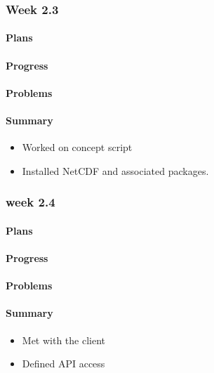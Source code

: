 \documentclass[onecolumn, draftclsnofoot,10pt, compsoc]{article}
\begin{document}
		\subsubsection{Week 2.3}
			\paragraph{Plans} \hfill \break

			\paragraph{Progress} \hfill \break

			\paragraph{Problems} \hfill \break

			\paragraph{Summary} \hfill \break
				\begin{itemize}
                    \item Worked on concept script
                    \item Installed NetCDF and associated packages.
                \end{itemize}


		\subsubsection{week 2.4}
			\paragraph{Plans} \hfill \break

			\paragraph{Progress} \hfill \break

			\paragraph{Problems} \hfill \break

			\paragraph{Summary} \hfill \break
				\begin{itemize}
                    \item Met with the client
                    \item Defined API access
                \end{itemize}
\end{document}
